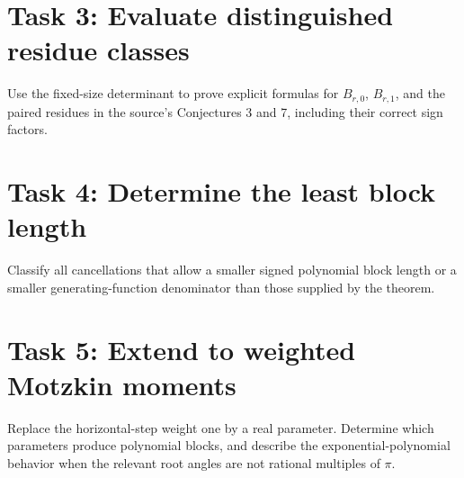 \documentclass[10pt]{article}
\begin{document}
\section*{Task 3: Evaluate distinguished residue classes}
Use the fixed-size determinant to prove explicit formulas for
$B_{r,0}$, $B_{r,1}$, and the paired residues in the source's
Conjectures 3 and 7, including their correct sign factors.

\section*{Task 4: Determine the least block length}
Classify all cancellations that allow a smaller signed polynomial
block length or a smaller generating-function denominator than
those supplied by the theorem.

\section*{Task 5: Extend to weighted Motzkin moments}
Replace the horizontal-step weight one by a real parameter.
Determine which parameters produce polynomial blocks, and describe
the exponential-polynomial behavior when the relevant root angles
are not rational multiples of $\pi$.
\end{document}

